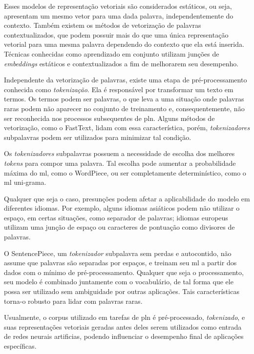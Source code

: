 Esses modelos de representação vetoriais são considerados estáticos, ou seja, apresentam um mesmo vetor para uma dada palavra, independentemente do contexto. Também existem os métodos de vetorização de palavras contextualizados, que podem possuir mais do que uma única representação vetorial para uma mesma palavra dependendo do contexto que ela está inserida. Técnicas conhecidas como aprendizado em conjunto utilizam junções de \textit{embeddings} estáticos e contextualizados a fim de melhorarem seu desempenho.

Independente da vetorização de palavras, existe uma etapa de pré-processamento conhecida como \textit{tokenização}. Ela é responsável por transformar um texto em termos. Os termos podem ser palavras, o que leva a uma situação onde palavras raras podem não aparecer no conjunto de treinamento e, consequentemente, não ser reconhecida nos processos subsequentes de \gls{pln}. Alguns métodos de vetorização, como o FastText, lidam com essa característica, porém, \textit{tokenizadores} subpalavras podem ser utilizados para minimizar tal condição.

Os \textit{tokenizadores} subpalavras possuem a necessidade de escolha dos melhores \textit{tokens} para compor uma palavra. Tal escolha pode aumentar a probabilidade máxima do \gls{ml}, como o WordPiece, ou ser completamente determinístico, como o \gls{ml} uni-grama.

Qualquer que seja o caso, presunções podem afetar a aplicabilidade do modelo em diferentes idiomas. Por exemplo, alguns idiomas asiáticos podem não utilizar o espaço, em certas situações, como separador de palavras; idiomas europeus utilizam uma junção de espaço ou caracteres de pontuação como divisores de palavras.

O SentencePiece, um \textit{tokenizador} subpalavra sem perdas e autocontido, não assume que palavras são separadas por espaços, e treinam seu \gls{ml} a partir dos dados com o mínimo de pré-processamento. Qualquer que seja o processamento, seu modelo é combinado juntamente com o vocabulário, de tal forma que ele possa ser utilizado sem ambiguidade por outras aplicações. Tais características torna-o robusto para lidar com palavras raras.

Usualmente, o corpus utilizado em tarefas de \gls{pln} é pré-processado, \textit{tokenizado}, e suas representações vetoriais geradas antes deles serem utilizados como entrada de redes neurais artificias, podendo influenciar o desempenho final de aplicações específicas.

